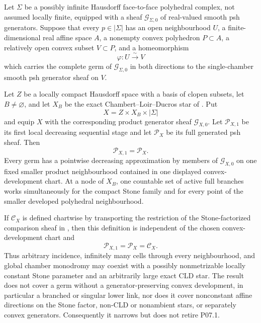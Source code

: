 
\begin{corollary}
\label{cor:p071-stone-infinite-star-generator-convex-collapse}
Let $\Sigma$ be a possibly infinite Hausdorff face-to-face polyhedral
complex, not assumed locally finite, equipped with a sheaf
$\mathcal G_{\Sigma,0}$ of real-valued smooth psh generators.  Suppose that
every $p\in|\Sigma|$ has an open neighbourhood $U$, a finite-dimensional
real affine space $A$, a nonempty convex polyhedron $P\subset A$, a
relatively open convex subset $V\subset P$, and a homeomorphism
\[
                          \varphi:U\xrightarrow{\sim}V
\]
which carries the complete germ of $\mathcal G_{\Sigma,0}$ in both
directions to the single-chamber smooth psh generator sheaf on $V$.

Let $Z$ be a locally compact Hausdorff space with a basis of clopen subsets,
let $B\ne\varnothing$, and let $X_B$ be the exact
Chambert--Loir--Ducros star of
.  Put
\[
                         X=Z\times X_B\times|\Sigma|
\]
and equip $X$ with the corresponding product generator sheaf
$\mathcal G_{X,0}$.  Let $\mathcal P_{X,1}$ be its first local decreasing
sequential stage and let $\mathcal P_X$ be its full generated psh sheaf.
Then
\begin{equation}
                         \mathcal P_{X,1}=\mathcal P_X.
 \label{eq:p071-stone-infinite-star-generator-convex-collapse}
\end{equation}
Every germ has a pointwise decreasing approximation by members of
$\mathcal G_{X,0}$ on one fixed smaller product neighbourhood contained in
one displayed convex-development chart.  At a node of $X_B$, one countable
set of active full branches works simultaneously for the compact Stone
family and for every point of the smaller developed polyhedral
neighbourhood.

If $\mathcal C_X$ is defined chartwise by transporting the restriction of
the Stone-factorized comparison sheaf in
, then this
definition is independent of the chosen convex-development chart and
\[
                         \mathcal P_{X,1}=\mathcal P_X=\mathcal C_X.
\]
Thus arbitrary incidence, infinitely many cells through every
neighbourhood, and global chamber monodromy may coexist with a possibly
nonmetrizable locally constant Stone parameter and an arbitrarily large
exact CLD star.  The result does not cover a germ without a
generator-preserving convex development, in particular a branched or
singular lower link, nor does it cover nonconstant affine directions on the
Stone factor, non-CLD or nonambient stars, or separately convex generators.
Consequently it narrows but does not retire P07.1.
\end{corollary}
